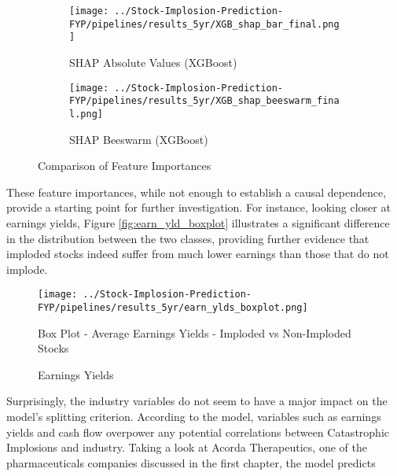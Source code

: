 \documentclass[a4paper]{report}
\begin{document}
\begin{figure}[H] %
  \centering
  \begin{subfigure}{0.45\textwidth} %
      \texttt{[image: ../Stock-Implosion-Prediction-FYP/pipelines/results\_5yr/XGB\_shap\_bar\_final.png]} %
      \caption{SHAP Absolute Values (XGBoost)}
      \label{fig:xgb_when_shap}
  \end{subfigure}
  \begin{subfigure}{0.45\textwidth} %
      \texttt{[image: ../Stock-Implosion-Prediction-FYP/pipelines/results\_5yr/XGB\_shap\_beeswarm\_final.png]} %
      \caption{SHAP Beeswarm (XGBoost)}
      \label{fig:xgb_when_shap_bee}
  \end{subfigure}
  \caption{Comparison of Feature Importances}
  \label{fig:comparison_shap_5yr}
\end{figure}These feature importances, while not enough to establish a causal dependence, provide a starting point for further investigation. For instance, looking closer at earnings yields, Figure \ref{fig:earn_yld_boxplot}
illustrates a significant difference in the distribution between the two classes, providing further evidence that imploded stocks indeed suffer from much lower earnings than those that do not implode. 
\begin{figure}[H] %
  \centering
      \texttt{[image: ../Stock-Implosion-Prediction-FYP/pipelines/results\_5yr/earn\_ylds\_boxplot.png]} %
      \caption{Box Plot - Average Earnings Yields - Imploded vs Non-Imploded Stocks}
      \label{fig:earn_yld_boxplot}
  \caption{Earnings Yields}
  \label{fig:earn_ylds_plots}
\end{figure}Surprisingly, the industry variables do not seem to have a major impact on the model's splitting criterion. According to the model, variables such as earnings yields and cash flow 
overpower any potential correlations between Catastrophic Implosions and industry. Taking a look at Acorda Therapeutics, one of the pharmaceuticals companies discussed in the first chapter, 
the model predicts
\end{document}
